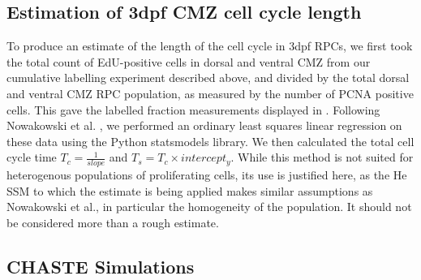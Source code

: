 \documentclass[10pt,letterpaper]{article}
\begin{document}
\subsection*{Estimation of 3dpf CMZ cell cycle length}
To produce an estimate of the length of the cell cycle in 3dpf RPCs, we first took the total count of EdU-positive cells in dorsal and ventral CMZ from our cumulative labelling experiment described above, and divided by the total dorsal and ventral CMZ RPC population, as measured by the number of PCNA positive cells. This gave the labelled fraction measurements displayed in . Following Nowakowski et al. \cite{Nowakowski1989}, we performed an ordinary least squares linear regression on these data using the Python statsmodels library. We then calculated the total cell cycle time $T_c = \frac{1}{slope}$ and $T_s = T_c \times intercept_y$. While this method is not suited for heterogenous populations of proliferating cells, its use is justified here, as the He SSM to which the estimate is being applied makes similar assumptions as Nowakowski et al., in particular the homogeneity of the population. It should not be considered more than a rough estimate.

\subsection*{CHASTE Simulations}
\end{document}

